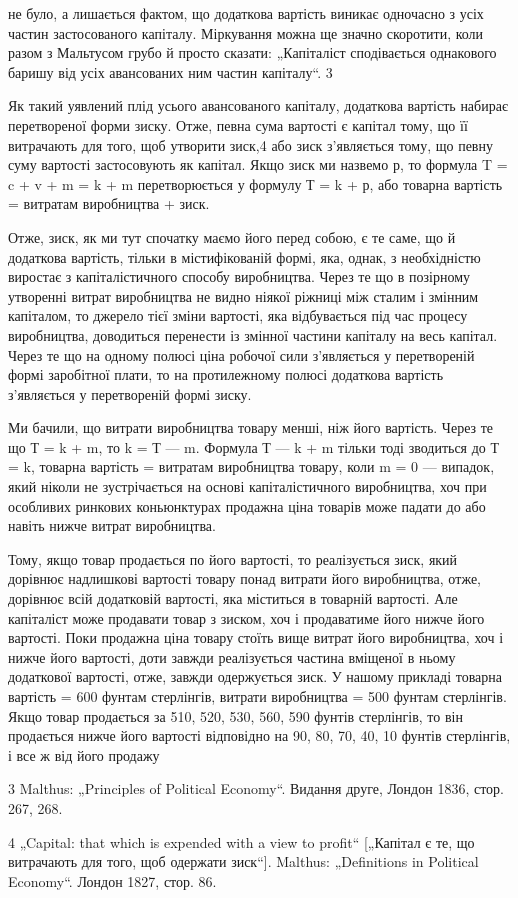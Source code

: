 не було, а лишається фактом, що додаткова вартість виникає одночасно
з усіх частин застосованого капіталу. Міркування можна
ще значно скоротити, коли разом з Мальтусом грубо й просто
сказати: „Капіталіст сподівається однакового баришу від усіх
авансованих ним частин капіталу“. 3

Як такий уявлений плід усього авансованого капіталу, додаткова
вартість набирає перетвореної форми зиску. Отже, певна
сума вартості є капітал тому, що її витрачають для того, щоб
утворити зиск,4 або зиск з’являється тому, що певну суму вартості
застосовують як капітал. Якщо зиск ми назвемо р, то формула
T = c + v + m = k + m перетворюється у формулу Т = k + р, або
товарна вартість = витратам виробництва + зиск.

Отже, зиск, як ми тут спочатку маємо його перед собою,
є те саме, що й додаткова вартість, тільки в містифікованій
формі, яка, однак, з необхідністю виростає з капіталістичного
способу виробництва. Через те що в позірному утворенні витрат
виробництва не видно ніякої ріжниці між сталим і змінним
капіталом, то джерело тієї зміни вартості, яка відбувається
під час процесу виробництва, доводиться перенести із змінної
частини капіталу на весь капітал. Через те що на одному полюсі
ціна робочої сили з’являється у перетвореній формі заробітної
плати, то на протилежному полюсі додаткова вартість з’являється
у перетвореній формі зиску.

Ми бачили, що витрати виробництва товару менші, ніж його
вартість. Через те що Т = k + m, то k = Т — m. Формула
Т — k + m тільки тоді зводиться до Т = k, товарна вартість =
витратам виробництва товару, коли m = 0 — випадок, який
ніколи не зустрічається на основі капіталістичного виробництва,
хоч при особливих ринкових коньюнктурах продажна ціна товарів
може падати до або навіть нижче витрат виробництва.

Тому, якщо товар продається по його вартості, то реалізується
зиск, який дорівнює надлишкові вартості товару понад витрати
його виробництва, отже, дорівнює всій додатковій вартості, яка
міститься в товарній вартості. Але капіталіст може продавати
товар з зиском, хоч і продаватиме його нижче його вартості.
Поки продажна ціна товару стоїть вище витрат його виробництва,
хоч і нижче його вартості, доти завжди реалізується
частина вміщеної в ньому додаткової вартості, отже, завжди
одержується зиск. У нашому прикладі товарна вартість = 600
фунтам стерлінгів, витрати виробництва = 500 фунтам стерлінгів.
Якщо товар продається за 510, 520, 530, 560, 590 фунтів
стерлінгів, то він продається нижче його вартості відповідно на
90, 80, 70, 40, 10 фунтів стерлінгів, і все ж від його продажу

3    Malthus: „Principles of Political Economy“. Видання друге, Лондон 1836,
стор. 267, 268.

4 „Capital: that which is expended with a view to profit“ [„Капітал є те, що
витрачають для того, щоб одержати зиск“]. Malthus: „Definitions in Political
Economy“. Лондон 1827, стор. 86.
